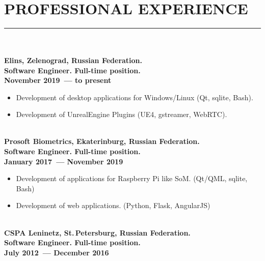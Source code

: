\documentclass[a4paper,oneside,12pt]{article}
\newcommand{\cvpart}[1]{%
\vspace{-0.9em}%
\section*{\Large\bfseries\MakeTextUppercase{#1}}%
\vspace{-1.7em}%
\rule{\linewidth}{0.3em}\\[-0.8em]%
}
\begin{document}
~\\

\pagebreak


\cvpart{Professional Experience}

~\\[-1em]

{\bf
Elins, Zelenograd, Russian Federation. \\
Software Engineer. Full-time position.\\
November 2019~--- to present
}
\begin{itemize}
    \item Development of desktop applications for Windows/Linux (Qt, sqlite, Bash).
    \item Development of UnrealEngine Plugins (UE4, gstreamer, WebRTC).
\end{itemize}

~\\[-1em]

{\bf
Prosoft Biometrics, Ekaterinburg, Russian Federation. \\
Software Engineer. Full-time position.\\
January 2017~--- November 2019
}
\begin{itemize}
    \item Development of applications for Raspberry Pi like SoM. (Qt/QML, sqlite, Bash)
    \item Development of web applications. (Python, Flask, AngularJS)
\end{itemize}

~\\[-1em]

{\bf
CSPA Leninetz, St.\,Petersburg, Russian Federation.\\
Software Engineer. Full-time position.\\
July 2012~--- December 2016
}
\end{document}
